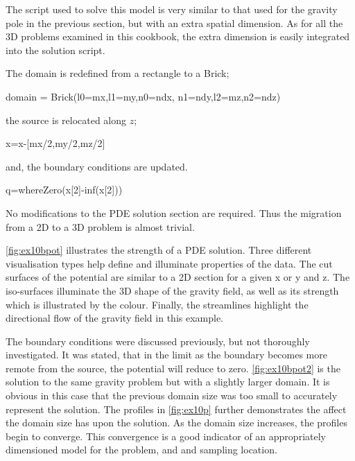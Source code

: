 The script used to solve this model is very similar to that used for the gravity
pole in the previous section, but with an extra spatial dimension. As for all
the 3D problems examined in this cookbook, the extra dimension is easily
integrated into the \esc solution script.

The domain is redefined from a rectangle to a Brick;
\begin{python}
domain = Brick(l0=mx,l1=my,n0=ndx, n1=ndy,l2=mz,n2=ndz)
\end{python}
the source is relocated along $z$;
\begin{python}
x=x-[mx/2,my/2,mz/2]
\end{python}
and, the boundary conditions are updated.
\begin{python}
q=whereZero(x[2]-inf(x[2]))
\end{python}
No modifications to the PDE solution section are required. Thus the migration
from a 2D to a 3D problem is almost trivial.

\autoref{fig:ex10bpot} illustrates the strength of a PDE solution. Three
different visualisation types help define and illuminate properties of the data.
The cut surfaces of the potential are similar to a 2D section for a given x or y
and z. The iso-surfaces illuminate the 3D shape of the gravity field, as well as
its strength which is illustrated by the colour. Finally, the streamlines
highlight the directional flow of the gravity field in this example.

The boundary conditions were discussed previously, but not thoroughly
investigated. It was stated, that in the limit as the boundary becomes more
remote from the source, the potential will reduce to zero.
\autoref{fig:ex10bpot2} is the solution to the same gravity problem
but with a slightly larger domain. It is obvious in this case that
the previous domain size was too small to accurately represent the
solution. The profiles in \autoref{fig:ex10p} further demonstrates the affect
the domain size has upon the solution. As the domain size increases, the
profiles begin to converge. This convergence is a good indicator of an
appropriately dimensioned model for the problem, and and sampling location. 

